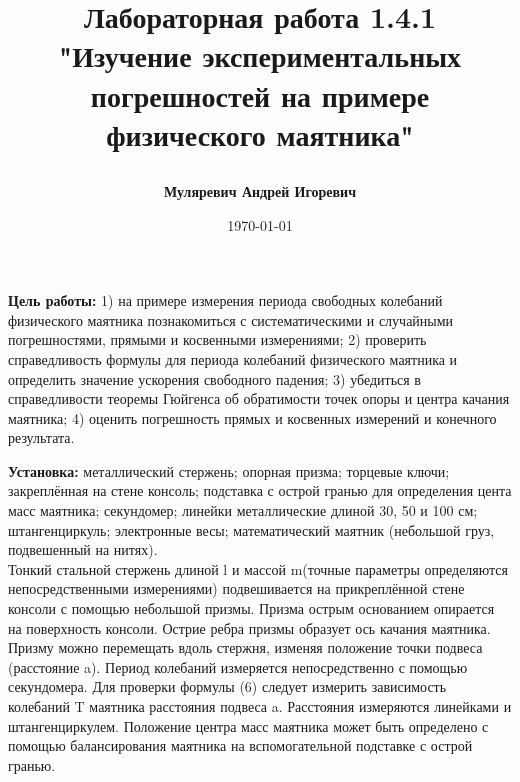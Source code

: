 \documentclass[a4paper, 12pt]{article}
\author{\textbf{Муляревич Андрей Игоревич}}
\title{
\begin{LARGE}
\textbf{Лабораторная работа 1.4.1}\\
"Изучение экспериментальных погрешностей на примере физического маятника"
\end{LARGE}
}
\date{\today}
\begin{document}
\maketitle
\newpage

\textbf{Цель работы:} 1) на примере измерения периода свободных колебаний физического
маятника познакомиться с систематическими и случайными погрешностями, прямыми и косвенными измерениями; 2) проверить справедливость формулы для периода колебаний физического маятника и определить значение ускорения свободного падения; 3) убедиться в справедливости теоремы Гюйгенса об обратимости
точек опоры и центра качания маятника; 4) оценить погрешность прямых и косвенных измерений и конечного результата.

\textbf{Установка:} металлический стержень; опорная призма; торцевые
ключи; закреплённая на стене консоль; подставка с острой гранью для определения
цента масс маятника; секундомер; линейки металлические длиной 30, 50 и 100 см;
штангенциркуль; электронные весы; математический маятник (небольшой груз,
подвешенный на нитях).\\ Тонкий стальной стержень длиной {\large l} и массой {\large m}(точные
параметры определяются непосредственными измерениями) подвешивается на прикреплённой стене консоли с помощью небольшой призмы.
Призма острым основанием опирается на поверхность консоли. Острие ребра призмы образует ось качания маятника. Призму можно перемещать
вдоль стержня, изменяя положение точки подвеса (расстояние {\large a}). Период
колебаний измеряется непосредственно с помощью секундомера. Для проверки формулы (6) следует измерить зависимость колебаний {\large T} маятника
расстояния подвеса {\large a}. Расстояния измеряются линейками и штангенциркулем. Положение центра масс маятника может быть определено с помощью
балансирования маятника на вспомогательной подставке с острой гранью.
\end{document}

